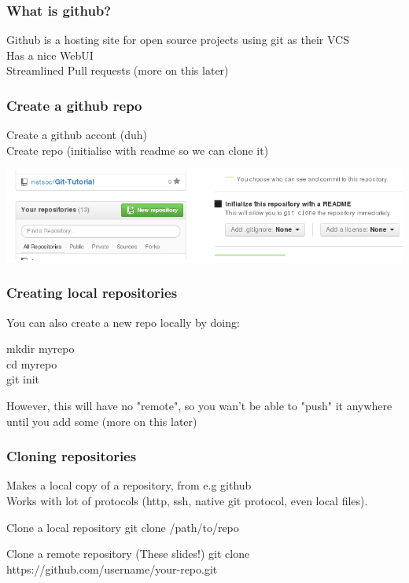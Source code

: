 \documentclass[xcolor=dvipsnames]{beamer}
\begin{document}
\begin{frame}
    \frametitle{What is github?}

    Github is a hosting site for open source projects using git as their VCS\\
    Has a nice WebUI\\
    Streamlined Pull requests (more on this later)\\
\end{frame}

\begin{frame}
    \frametitle{Create a github repo}

    Create a github accont (duh)\\
    Create repo (initialise with readme so we can clone it)
    \begin{center}
        \includegraphics[scale=0.4]{gh-create-repo.png}
    \end{center}

\end{frame}

\begin{frame}
    \frametitle{Creating local repositories}

    You can also create a new repo locally by doing:
    \begin{block}{}
        mkdir myrepo\\
        cd myrepo\\
        git init
    \end{block}
    However, this will have no "remote", so you wan't be able to "push" it anywhere until you add some (more on this later)
\end{frame}

\begin{frame}
    \frametitle{Cloning repositories}
    Makes a local copy of a repository, from e.g github\\
    Works with lot of protocols (http, ssh, native git protocol, even local files).

    \begin{block}{Clone a local repository}
        git clone /path/to/repo
    \end{block}
    \begin{block}{Clone a remote repository (These slides!)}
        git clone https://github.com/username/your-repo.git
    \end{block}
\end{frame}
\end{document}
